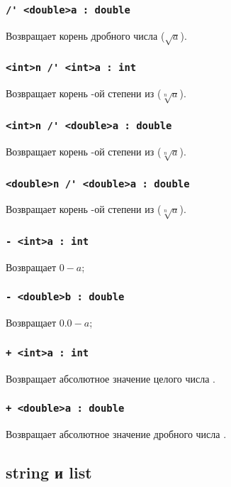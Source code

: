 \documentclass[a4paper, 14pt]{extarticle}
\begin{document}
\subsubsection{\lstinline`/' <double>a : double`}
Возвращает корень дробного числа  ($\sqrt{a}$).

\subsubsection{\lstinline`<int>n /' <int>a : int`}
Возвращает корень -ой степени из  ($\sqrt[n]{a}$).

\subsubsection{\lstinline`<int>n /' <double>a : double`}
Возвращает корень -ой степени из  ($\sqrt[n]{a}$).

\subsubsection{\lstinline`<double>n /' <double>a : double`}
Возвращает корень -ой степени из  ($\sqrt[n]{a}$).


\subsubsection{\lstinline`- <int>a : int`}
Возвращает $0-a$;

\subsubsection{\lstinline`- <double>b : double`}
Возвращает $0.0-a$;

\subsubsection{\lstinline`+ <int>a : int`}
Возвращает абсолютное значение целого числа .

\subsubsection{\lstinline`+ <double>a : double`}
Возвращает абсолютное значение дробного числа .

\subsection{{\color{bluemarin}string} и {\color{bluemarin}list}}
\end{document}
